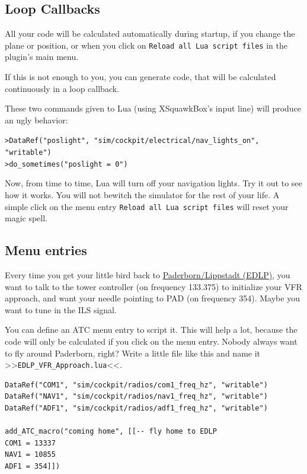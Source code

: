 \documentclass[11pt,parskip=half,a4paper]{scrartcl}
\begin{document}
\subsection{Loop Callbacks}

All your code will be calculated automatically during startup, if you change the plane or position, or when you click on \verb|Reload all Lua script files| in the plugin's main menu.

If this is not enough to you, you can generate code, that will be calculated continuously in a loop callback.

These two commands given to Lua (using XSquawkBox's input line) will produce an ugly behavior:

\verb|>DataRef("poslight", "sim/cockpit/electrical/nav_lights_on", "writable")|\\
\verb|>do_sometimes("poslight = 0")|

Now, from time to time, Lua will turn off your navigation lights. Try it out to see how it works. You will not bewitch the simulator for the rest of your life. A simple click on the menu entry \verb|Reload all Lua script files| will reset your magic spell.

\subsection{Menu entries}

Every time you get your little bird back to \href{http://nav.vatsim-germany.org/files/edgg/charts/edlp/public/EDLP_ILS24.pdf}{Paderborn/Lippstadt (EDLP)}, you want to talk to the tower controller (on frequency 133.375) to initialize your VFR approach, and want your needle pointing to PAD (on frequency 354). Maybe you want to tune in the ILS signal.

You can define an ATC menu entry to script it. This will help a lot, because the code will only be calculated if you click on the menu entry. Nobody always want to fly around Paderborn, right? Write a little file like this and name it >>\verb|EDLP_VFR_Approach.lua|<<.

\begin{lstlisting}
DataRef("COM1", "sim/cockpit/radios/com1_freq_hz", "writable")
DataRef("NAV1", "sim/cockpit/radios/nav1_freq_hz", "writable")
DataRef("ADF1", "sim/cockpit/radios/adf1_freq_hz", "writable")

add_ATC_macro("coming home", [[-- fly home to EDLP
COM1 = 13337
NAV1 = 10855
ADF1 = 354]])
\end{lstlisting}
\end{document}
